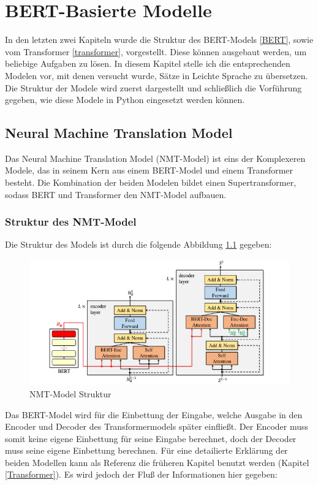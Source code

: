 \chapter{BERT-Basierte Modelle}

In den letzten zwei Kapiteln wurde die Struktur des BERT-Models \ref{BERT}, sowie vom Transformer \ref{transformer},  vorgestellt. Diese können ausgebaut werden, um beliebige Aufgaben zu lösen. In diesem Kapitel stelle ich die entsprechenden Modelen vor, mit denen versucht wurde, Sätze in Leichte Sprache zu übersetzen. Die Struktur der Modele wird zuerst dargestellt und schließlich die Vorführung gegeben, wie diese Modele in Python eingesetzt werden können.

\section{Neural Machine Translation Model}
Das Neural Machine Translation Model (NMT-Model) ist eins der Komplexeren Modele, das in seinem Kern aus einem BERT-Model und einem Transformer besteht. Die Kombination der beiden Modelen bildet einen Supertransformer, sodass BERT und Transformer den NMT-Model aufbauen.

\subsection{Struktur des NMT-Model}
Die Struktur des Models ist durch die folgende Abbildung \ref{nmt_model_figure} gegeben:

\begin{figure}
	\centering
	\includegraphics[scale=0.5]{images/NMT-Model.png}
	\caption{NMT-Model Struktur \cite{NMT:20}}
	\label{nmt_model_figure}
\end{figure}

Das BERT-Model wird für die Einbettung der Eingabe, welche Ausgabe in den Encoder und Decoder des Transformermodels später einfließt. Der Encoder muss somit keine eigene Einbettung für seine Eingabe berechnet, doch der Decoder muss seine eigene Einbettung berechnen. Für eine detailierte Erklärung der beiden Modellen kann als Referenz die früheren Kapitel benutzt werden (Kapitel \ref{Transformer}). Es wird jedoch der Fluß der Informationen hier gegeben:

